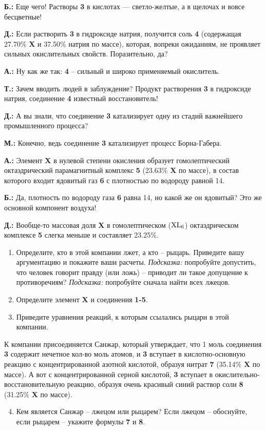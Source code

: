 \textbf{Б.:} Еще чего! Растворы \textbf{3} в кислотах --- светло-желтые, а в щелочах и вовсе бесцветные!

\textbf{Д.:} Если растворить \textbf{3} в гидроксиде натрия, получится соль \textbf{4} (содержащая 27.70\% \textbf{X} и 37.50\% натрия по массе), которая, вопреки ожиданиям, не проявляет сильных окислительных свойств. Поразительно, да?

\textbf{А.:} Ну как же так: \textbf{4} – сильный и широко применяемый окислитель.

\textbf{Т.:} Зачем вводить людей в заблуждение? Продукт растворения \textbf{3} в гидроксиде натрия, соединение \textbf{4} известный восстановитель!

\textbf{Д.:} А вы знали, что соединение \textbf{3} катализирует одну из стадий важнейшего промышленного процесса?

\textbf{М.:} Конечно, ведь соединение \textbf{3} катализирует процесс Борна-Габера.

\textbf{А.:} Элемент \textbf{X} в нулевой степени окисления образует гомолептический октаэдрический парамагнитный комплекс \textbf{5} (23.63\% \textbf{X} по массе), в состав которого входит ядовитый газ \textbf{6} с плотностью по водороду равной 14.

\textbf{Б.:} Да, плотность по водороду газа \textbf{6} равна 14, но какой же он ядовитый? Это же основной компонент воздуха!

\textbf{Д.:} Вообще-то массовая доля \textbf{X} в гомолептическом ($\ce{XL6}$) октаэдрическом комплексе \textbf{5} слегка меньше и составляет 23.25\%.

\begin{enumerate}
  \item Определите, кто в этой компании лжет, а кто – рыцарь. Приведите вашу аргументацию и покажите ваши расчеты. \textit{Подсказка:} попробуйте допустить, что человек говорит правду (или ложь) – приводит ли такое допущение к противоречиям? \textit{Подсказка:} попробуйте сначала найти всех лжецов.
  \item Определите элемент \textbf{X} и соединения \textbf{1-5}.
  \item Приведите уравнения реакций, к которым ссылались рыцари в этой компании.
\end{enumerate}

К компании присоединяется Санжар, который утверждает, что 1 моль соединения \textbf{3} содержит нечетное кол-во моль атомов, и \textbf{3} вступает в кислотно-основную реакцию с концентрированной азотной кислотой, образуя нитрат \textbf{7} (35.14\% \textbf{X} по массе). А вот с концентрированной серной кислотой, \textbf{3} вступает в окислительно-восстановительную реакцию, образуя очень красивый синий раствор соли \textbf{8} (31.25\% \textbf{X} по массе).

\begin{enumerate}
  \setcounter{enumi}{3}
  \item Кем является Санжар – лжецом или рыцарем? Если лжецом – обоснуйте, если рыцарем – укажите формулы \textbf{7} и \textbf{8}.
\end{enumerate}
